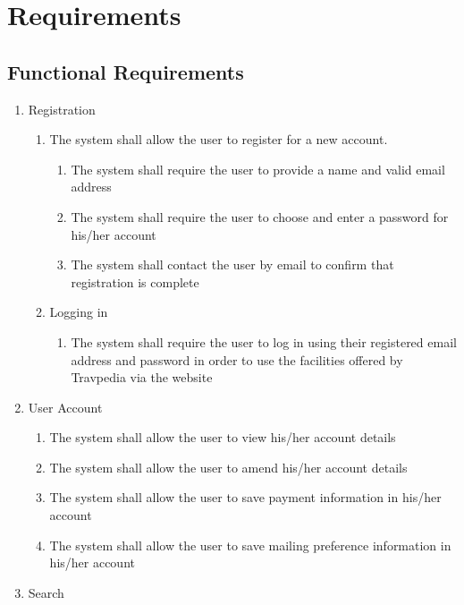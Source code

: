 \section{Requirements}

\subsection{Functional Requirements}

\begin{enumerate}
	\item Registration

		\begin{enumerate}
			\item The system shall allow the user to register for a new account.

				\begin{enumerate}
					\item The system shall require the user to provide a name and valid email
						address
					\item The system shall require the user to choose and enter a password for
						his/her account
					\item The system shall contact the user by email to confirm that registration
						is complete
				\end{enumerate}
			\item Logging in

				\begin{enumerate}
					\item The system shall require the user to log in using their registered
						email address and password in order to use the facilities offered
						by Travpedia via the website
				\end{enumerate}
		\end{enumerate}
	\item User Account

		\begin{enumerate}
			\item The system shall allow the user to view his/her account details
			\item The system shall allow the user to amend his/her account details
			\item The system shall allow the user to save payment information in his/her
				account
			\item The system shall allow the user to save mailing preference information
				in his/her account
		\end{enumerate}
	\item Search


\end{enumerate}
